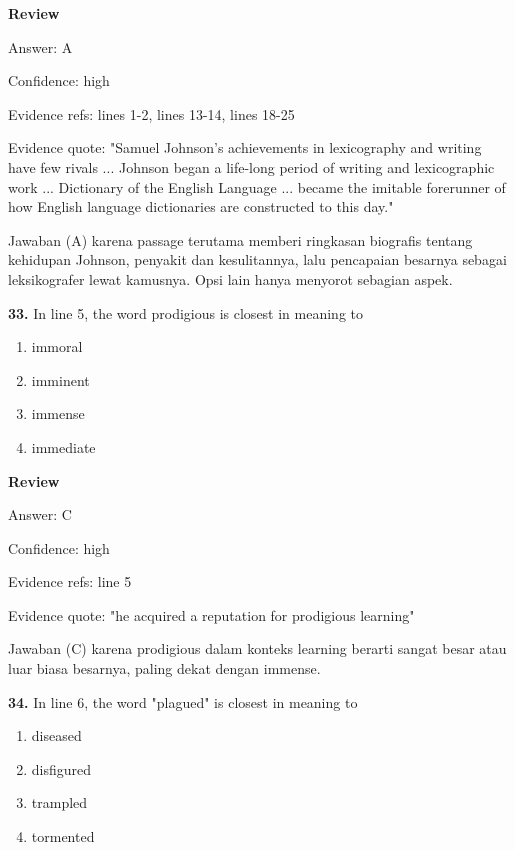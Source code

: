\documentclass[12pt]{article}
\begin{document}
\setlength{\parindent}{0pt}
\textbf{Review}\par
Answer: A\par
Confidence: high\par
Evidence refs: lines 1-2, lines 13-14, lines 18-25\par
Evidence quote: "Samuel Johnson's achievements in lexicography and writing have few rivals ... Johnson began a life-long period of writing and lexicographic work ... Dictionary of the English Language ... became the imitable forerunner of how English language dictionaries are constructed to this day."\par
Jawaban (A) karena passage terutama memberi ringkasan biografis tentang kehidupan Johnson, penyakit dan kesulitannya, lalu pencapaian besarnya sebagai leksikografer lewat kamusnya. Opsi lain hanya menyorot sebagian aspek.\par
\endgroup
\par
\vspace{0.25\baselineskip}
\noindent\textbf{33.} In line 5, the word prodigious is closest in meaning to
\begin{enumerate}[label=(\Alph*),leftmargin=*,itemsep=0.2em]
\item immoral
\item imminent
\item immense
\item immediate
\end{enumerate}
\par
\begingroup
\setlength{\parskip}{0pt}
\setlength{\parindent}{0pt}
\textbf{Review}\par
Answer: C\par
Confidence: high\par
Evidence refs: line 5\par
Evidence quote: "he acquired a reputation for prodigious learning"\par
Jawaban (C) karena prodigious dalam konteks learning berarti sangat besar atau luar biasa besarnya, paling dekat dengan immense.\par
\endgroup
\par
\vspace{0.25\baselineskip}
\noindent\textbf{34.} In line 6, the word "plagued" is closest in meaning to
\begin{enumerate}[label=(\Alph*),leftmargin=*,itemsep=0.2em]
\item diseased
\item disfigured
\item trampled
\item tormented
\end{enumerate}
\end{document}

